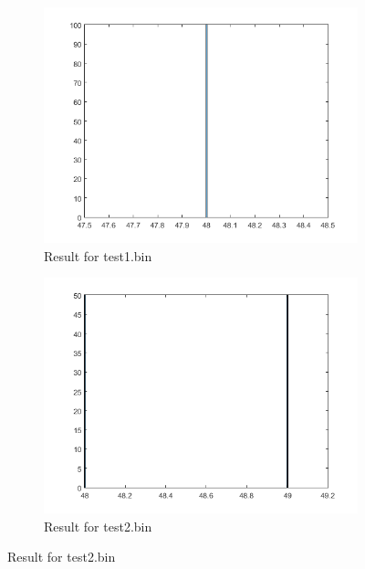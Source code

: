 \documentclass[oneside,a4paper,12pt]{report}
\begin{document}
\begin{figure}
\begin{subfigure}{0.5\textwidth}
\includegraphics[scale=0.5]{test1.png}
\caption{Result for test1.bin}
\end{subfigure}
\begin{subfigure}{0.5\textwidth}
\includegraphics[scale=0.5]{test2.png}
\caption{Result for test2.bin}
\end{subfigure}
\end{figure}
\end{document}
